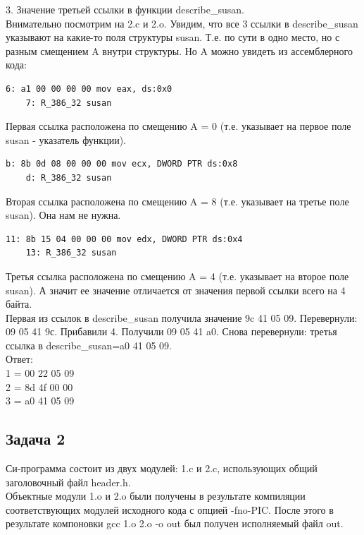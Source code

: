 \documentclass[12pt, letterpaper]{article}
\begin{document}
3. Значение третьей ссылки в функции describe\_susan.\\

Внимательно посмотрим на 2.c и 2.o. Увидим, что все 3 ссылки в describe\_susan указывают на какие-то поля структуры susan. Т.е. по сути в одно место, но с разным смещением A внутри структуры. Но A можно увидеть из ассемблерного кода:
\begin{verbatim}
6: a1 00 00 00 00 mov eax, ds:0x0
    7: R_386_32 susan
\end{verbatim}
Первая ссылка расположена по смещению A = 0 (т.е. указывает на первое поле susan - указатель функции).
\begin{verbatim}
b: 8b 0d 08 00 00 00 mov ecx, DWORD PTR ds:0x8
    d: R_386_32 susan
\end{verbatim}
Вторая ссылка расположена по смещению A = 8 (т.е. указывает на третье поле susan). Она нам не нужна.
\begin{verbatim}
11: 8b 15 04 00 00 00 mov edx, DWORD PTR ds:0x4
    13: R_386_32 susan
\end{verbatim}
Третья ссылка расположена по смещению A = 4 (т.е. указывает на второе поле susan). А значит ее значение отличается от значения первой ссылки всего на 4 байта.\\
Первая из ссылок в describe\_susan получила значение 9c 41 05 09. Перевернули: 09 05 41 9с. Прибавили 4. Получили 09 05 41 a0. Снова перевернули: третья ссылка в describe\_susan=a0 41 05 09.\\
Ответ:\\
1 = 00 22 05 09\\
2 = 8d 4f 00 00\\
3 = a0 41 05 09
\newpage
\subsection{Задача 2}
Си-программа состоит из двух модулей: 1.c и 2.c, использующих общий заголовочный файл header.h.\\
Объектные модули 1.o и 2.o были получены в результате компиляции соответствующих модулей исходного кода с опцией -fno-PIC. После этого в результате компоновки gcc 1.o 2.o -o out был получен исполняемый файл out.\\
\end{document}
